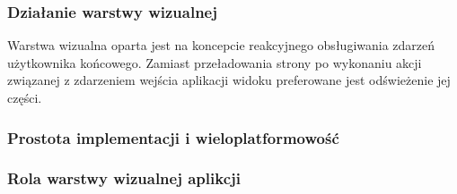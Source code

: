 \subsubsection{Działanie warstwy wizualnej}
Warstwa wizualna oparta jest na koncepcie reakcyjnego obsługiwania zdarzeń użytkownika końcowego. Zamiast przeładowania strony po wykonaniu akcji związanej z zdarzeniem wejścia aplikacji widoku preferowane jest odświeżenie jej części.
\subsubsection{Prostota implementacji i wieloplatformowość}

\subsubsection{Rola warstwy wizualnej aplikcji}

